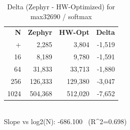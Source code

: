 \begin{table}[tb]
    \centering
    \caption{Delta (Zephyr - HW-Optimized) for max32690 / softmax}
    \label{tab:delta_max32690_softmax}
    \scriptsize
    \begin{tabular}{r r r r}
        \hline
        \textbf{N} & \textbf{Zephyr} & \textbf{HW-Opt} & \textbf{Delta} \\\n+        \hline
        4 & 2,285 & 3,804 & -1,519\\
        16 & 8,189 & 9,780 & -1,591\\
        64 & 31,833 & 33,713 & -1,880\\
        256 & 126,333 & 129,380 & -3,047\\
        1024 & 504,368 & 512,020 & -7,652\\
        \hline
    \end{tabular}
    \vspace{2mm}\\\n    Slope vs log2(N): -686.100 \ (R^2=0.698)\n\end{table}
